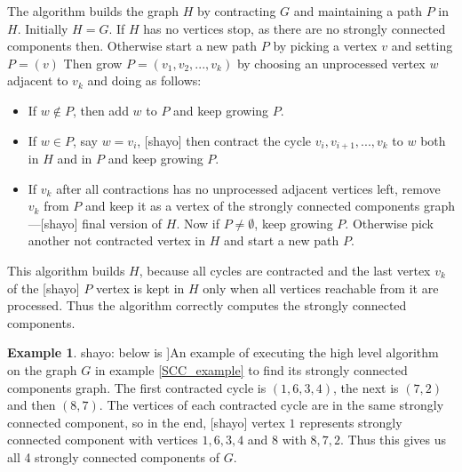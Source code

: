 \documentclass{report}
\theoremstyle{plain}
\theoremstyle{definition}
\newtheorem{example}{Example}
\theoremstyle{remark}
\numberwithin{definition}{chapter}
\numberwithin{example}{chapter}
\numberwithin{figure}{chapter}
\begin{document}
{{{{The algorithm builds the graph $H$ by contracting $G$ and maintaining a path $P$ in $H$. Initially $H=G$. If $H$ has no vertices stop, as there are no strongly connected components then. Otherwise start a new path $P$ by picking a vertex $v$ and setting $P = (v)$ Then grow $P=(v_1,v_2,...,v_k)$ by choosing an unprocessed vertex $w$ adjacent to $v_k$ and doing as follows:

\begin{itemize}
  \item If $w \not \in P$, then add $w$ to $P$ and keep growing $P$.
  \item If $w \in P$, say $w=v_i$, [shayo] then contract the cycle $v_i,v_{i+1},...,v_k$ to $w$ both in $H$ and in $P$ and keep growing $P$.
  \item If $v_k$ after all contractions has no unprocessed adjacent vertices left, remove $v_k$ from $P$ and keep it as a vertex of the strongly connected components graph ---[shayo] final version of $H$. Now if $P \not = \emptyset$, keep growing $P$. Otherwise pick another not contracted vertex in $H$ and start a new path $P$.
\end{itemize}

This algorithm builds $H$, because all cycles are contracted and the last vertex $v_k$ of the [shayo] $P$ vertex is kept in $H$ only when all vertices reachable from it are processed. Thus the algorithm correctly computes the strongly connected components.

\begin{example}

{shayo: below is ]An example of executing the high level algorithm on the graph $G$ in example \ref{SCC_example} to find its strongly connected components graph. The first contracted cycle is $(1,6,3,4)$, the next is $(7,2)$ and then $(8,7)$. The vertices of each contracted cycle are in the same strongly connected component, so in the end, [shayo] vertex $1$ represents strongly connected component with vertices $1,6,3,4$ and $8$ with $8,7,2$. Thus this gives us all 4 strongly connected components of $G$.

\begin{figure}[h]
\center

\begin{minipage}[h]{0.24\textwidth}


\end{minipage}
\end{figure}}
\end{example}}}}}
\end{document}
